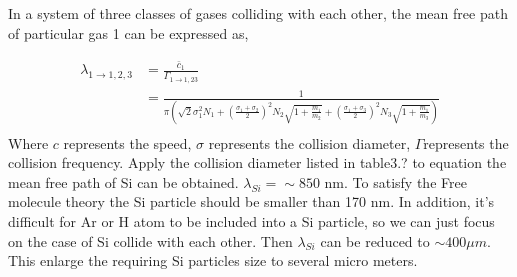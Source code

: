 In a system of  three classes of gases colliding with each other, the mean free path of  particular gas 1  can be expressed as,

\begin{equation}
\begin{split}
\lambda_{1 \rightarrow 1,2,3} &= \frac{\bar{c}_{1}}{\Gamma_{1 \rightarrow 1,23}}\\
&=\frac{1}{\pi\left(\sqrt{2} \sigma_{1}^{2} N_{1}+\left(\frac{\sigma_{1}+\sigma_{2}}{2}\right)^{2} N_{2} \sqrt{1+\frac{m_{1}}{m_{2}}}+\left(\frac{\sigma_{1}+\sigma_{3}}{2}\right)^{2} N_{3} \sqrt{1+\frac{m_{1}}{m_{3}}}\right)}\\
\end{split}
\tag{3.1.18}
\end{equation}
Where $c$ represents the speed, $\sigma $ represents the collision diameter, $\Gamma $represents the collision frequency.
Apply the collision diameter listed in table3.? to equation the mean free path  of Si can be  obtained. $\lambda_{Si}=\sim 850$ nm. To satisfy the Free molecule theory the Si particle should be smaller than 170 nm. In addition, it’s difficult for Ar or H atom to be included into a Si particle, so we can just focus on the case of Si collide with each other. Then $\lambda_{Si}$ can be reduced to $\sim 400 \mu m$. This enlarge the requiring Si particles size to several micro meters. 

